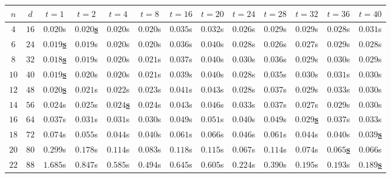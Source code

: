 \begin{table}[ht]
    \centering
    \begin{adjustwidth}{-1.1cm}{-1.1cm}
    {\renewcommand{\arraystretch}{1.05}
        \setlength{\tabcolsep}{2.5pt}
        \small
        \begin{tabular}{ccccccccccccc}
            $n$ & $d$ & $t = 1$ & $t = 2$ & $t = 4$ & $t = 8$ & $t = 16$ & $t = 20$ & $t = 24$ & $t = 28$ & $t = 32$ & $t = 36$ & $t = 40$ \\
            \hline
            $4$ & $16$ & $0.020$s & \underline{$\mathbf{0.020}$\textbf{s}} & $0.020$s & $0.020$s & $0.035$s & $0.032$s & $0.026$s & $0.029$s & $0.029$s & $0.028$s & $0.031$s \\
            $6$ & $24$ & \underline{$\mathbf{0.019}$\textbf{s}} & $0.019$s & $0.020$s & $0.020$s & $0.036$s & $0.040$s & $0.028$s & $0.026$s & $0.027$s & $0.029$s & $0.028$s \\
            $8$ & $32$ & \underline{$\mathbf{0.018}$\textbf{s}} & $0.019$s & $0.020$s & $0.021$s & $0.037$s & $0.040$s & $0.030$s & $0.036$s & $0.029$s & $0.030$s & $0.029$s \\
            $10$ & $40$ & \underline{$\mathbf{0.019}$\textbf{s}} & $0.020$s & $0.020$s & $0.021$s & $0.039$s & $0.040$s & $0.028$s & $0.035$s & $0.030$s & $0.031$s & $0.030$s \\
            $12$ & $48$ & \underline{$\mathbf{0.020}$\textbf{s}} & $0.021$s & $0.022$s & $0.023$s & $0.041$s & $0.043$s & $0.028$s & $0.037$s & $0.029$s & $0.033$s & $0.030$s \\
            $14$ & $56$ & $0.024$s & $0.025$s & \underline{$\mathbf{0.024}$\textbf{s}} & $0.024$s & $0.043$s & $0.046$s & $0.033$s & $0.037$s & $0.027$s & $0.029$s & $0.030$s \\
            $16$ & $64$ & $0.037$s & $0.031$s & $0.031$s & $0.030$s & $0.049$s & $0.051$s & $0.040$s & $0.049$s & \underline{$\mathbf{0.029}$\textbf{s}} & $0.037$s & $0.033$s \\
            $18$ & $72$ & $0.074$s & $0.055$s & $0.044$s & $0.040$s & $0.061$s & $0.066$s & $0.046$s & $0.061$s & $0.044$s & $0.040$s & \underline{$\mathbf{0.039}$\textbf{s}} \\
            $20$ & $80$ & $0.299$s & $0.178$s & $0.114$s & $0.083$s & $0.118$s & $0.115$s & $0.067$s & $0.114$s & $0.074$s & \underline{$\mathbf{0.065}$\textbf{s}} & $0.066$s \\
            $22$ & $88$ & $1.685$s & $0.847$s & $0.585$s & $0.494$s & $0.645$s & $0.605$s & $0.224$s & $0.390$s & $0.195$s & $0.193$s & \underline{$\mathbf{0.189}$\textbf{s}} \\

\end{tabular}}
\end{adjustwidth}
\end{table}
